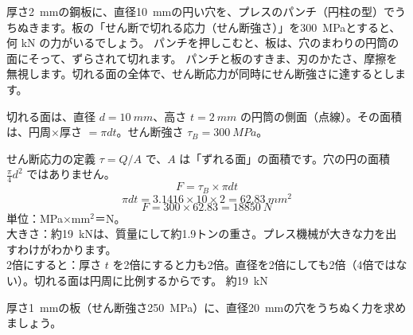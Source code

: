\begin{phreidai}[パンチで穴をあける力]
\label{ph:力-8:ex7}厚さ\qty{2}{mm}の鋼板に、直径\qty{10}{mm}の円い穴を、プレスのパンチ（円柱の型）でうちぬきます。板の「せん断で切れる応力（せん断強さ）」を\qty{300}{MPa}とすると、何 kN の力がいるでしょう。
\phbamen
パンチを押しこむと、板は、穴のまわりの円筒の面にそって、ずらされて切れます。
\phmushi
パンチと板のすきま、刃のかたさ、摩擦を無視します。切れる面の全体で、せん断応力が同時にせん断強さに達するとします。
\phzu
\noindent\begin{minipage}[c]{0.40\linewidth}\centering
{}
\end{minipage}\hfill
\begin{minipage}[c]{0.56\linewidth}\raggedright
切れる面は、直径 $d=\qty{10}{mm}$、高さ $t=\qty{2}{mm}$ の円筒の側面（点線）。その面積は、円周×厚さ $=\pi dt$。せん断強さ $\tau_B=\qty{300}{MPa}$。
\end{minipage}
\phriyu
せん断応力の定義 $\tau=Q/A$ で、$A$ は「ずれる面」の面積です。穴の円の面積 $\tfrac{\pi}{4}d^2$ ではありません。
\phtateru
\[F=\tau_B\times\pi dt\]
\phtoku
\[\pi dt=3.1416\times10\times2=\qty{62.83}{mm^2}\]
\[F=300\times62.83=\qty{18850}{N}\]
\phtashikame
単位：MPa×mm$^2$＝N。\\
大きさ：約\qty{19}{kN}は、質量にして約1.9トンの重さ。プレス機械が大きな力を出すわけがわかります。\\
2倍にすると：厚さ $t$ を2倍にすると力も2倍。直径を2倍にしても2倍（4倍ではない）。切れる面は円周に比例するからです。
\kotae 約\qty{19}{kN}
\end{phreidai}
\begin{jibun}
厚さ\qty{1}{mm}の板（せん断強さ\qty{250}{MPa}）に、直径\qty{20}{mm}の穴をうちぬく力を求めましょう。
\end{jibun}

